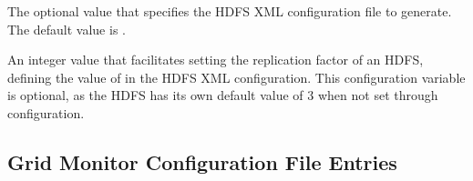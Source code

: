 \begin{description}
\label{param:HDFSSiteFile}
\item[\Macro{HDFS\_SITE\_FILE}]
  The optional value that specifies the HDFS XML configuration file to generate.
  The default value is .

\label{param:HDFSReplication}
\item[\Macro{HDFS\_REPLICATION}]
  An integer value that facilitates setting the replication factor of an HDFS,
  defining the value of  in the HDFS XML
  configuration.  This configuration variable is optional, as the HDFS has
  its own default value of 3 when not set through configuration.

\end{description}

\subsection{\label{sec:GridMonitor-Config-File-Entries}Grid Monitor
Configuration File Entries}

